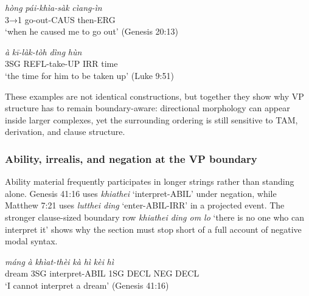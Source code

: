 \documentclass[
  11pt,
  a4paper,
]{article}
\newcommand{\tdim}[1]{\textit{#1}}
\newcommand{\tdimword}[1]{\textit{#1}}
\renewcommand{\textsc}[1]{{\footnotesize\MakeUppercase{#1}}}
\newcommand{\glossquote}[1]{`#1'}
\begin{document}
\begin{exe}
\ex \label{ex:vp-paikhiatsak-gen20}
\gll \tdimword{hòng} \tdimword{pái-khìa-sàk} \tdimword{cìang-ìn} \\
     \textsc{3→1} go-out-\textsc{caus} then-\textsc{erg} \\
\glt \glossquote{when he caused me to go out} (Genesis 20:13)
\end{exe}

\begin{exe}
\ex \label{ex:vp-kilaktoh-ding-luke9}
\gll \tdimword{à} \tdimword{kī-làk-tòh} \tdimword{dìng} \tdimword{hùn} \\
     \textsc{3sg} \textsc{refl}-take-\textsc{up} \textsc{irr} time \\
\glt \glossquote{the time for him to be taken up} (Luke 9:51)
\end{exe}

These examples are not identical constructions, but together they show
why VP structure has to remain boundary-aware: directional morphology
can appear inside larger complexes, yet the surrounding ordering is
still sensitive to TAM, derivation, and clause structure.

\subsubsection{Ability, irrealis, and negation at the VP
boundary}\label{ability-irrealis-and-negation-at-the-vp-boundary}

Ability material frequently participates in longer strings rather than
standing alone. Genesis 41:16 uses \tdim{khiathei}
\glossquote{interpret-ABIL} under negation, while Matthew 7:21 uses
\tdim{lutthei ding} \glossquote{enter-ABIL-IRR} in a projected event.
The stronger clause-sized boundary row \tdim{khiathei ding om lo}
\glossquote{there is no one who can interpret it} shows why the section
must stop short of a full account of negative modal syntax.

\begin{exe}
\ex \label{ex:vp-khiathei-gen41}
\gll \tdimword{máng} \tdimword{à} \tdimword{khìat-thèi} \tdimword{kà} \tdimword{hì} \tdimword{kèi} \tdimword{hì} \\
     dream \textsc{3sg} interpret-\textsc{abil} \textsc{1sg} \textsc{decl} \textsc{neg} \textsc{decl} \\
\glt \glossquote{I cannot interpret a dream} (Genesis 41:16)
\end{exe}
\end{document}
